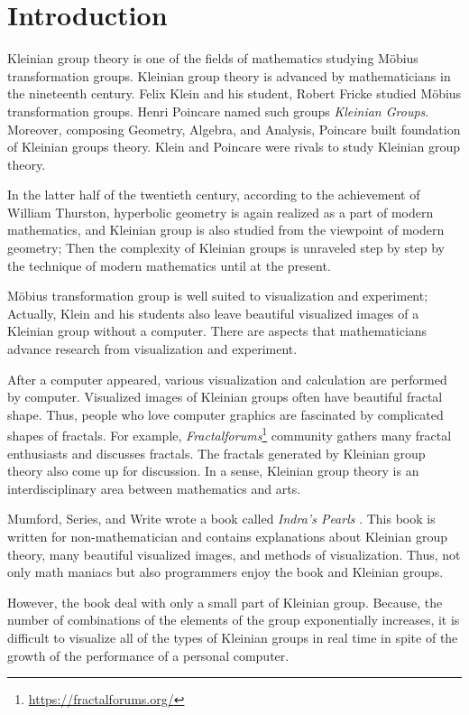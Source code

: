 
\section{Introduction}

Kleinian group theory is one of the fields of mathematics studying 
M\"obius transformation groups.
Kleinian group theory is advanced by mathematicians in the nineteenth
century.
Felix Klein and his student, Robert Fricke studied M\"obius
transformation groups.
Henri Poincare named such groups \textit{Kleinian Groups}.
Moreover, composing Geometry, Algebra, and Analysis,
Poincare built foundation of Kleinian groups theory.
Klein and Poincare were rivals to study Kleinian group theory.

In the latter half of the twentieth century, according to the achievement of William
Thurston, hyperbolic geometry is again realized as a part of modern
mathematics, and Kleinian group is also studied from the viewpoint of
modern geometry;
Then the complexity of Kleinian groups is unraveled step by step by
the technique of modern mathematics until at the present.

M\"obius transformation group is well suited to visualization and
experiment; Actually, Klein and his students also leave beautiful
visualized images of a Kleinian group without a computer.
There are aspects that mathematicians advance research from
visualization and experiment.

After a computer appeared, various visualization and calculation are
performed by computer.
Visualized images of Kleinian groups often have beautiful fractal shape.
Thus, people who love computer graphics are fascinated by complicated shapes of fractals.
For example,
\textit{Fractalforums}\footnote{\url{https://fractalforums.org/}}
community gathers many fractal enthusiasts and discusses fractals.
The fractals generated by Kleinian group theory also come up for
discussion.
In a sense, Kleinian group theory is an interdisciplinary area between
mathematics and arts.

Mumford, Series, and Write wrote a book called
\textit{Indra's Pearls} \cite{MumfordSeriesWright200204}.
This book is written for non-mathematician and contains explanations
about Kleinian group theory, many beautiful visualized images, and
methods of visualization.
Thus, not only math maniacs but also programmers enjoy the book and
Kleinian groups.

However, the book deal with only a small part of Kleinian group.
Because, the number of combinations of the elements of the group
exponentially increases, it is difficult to
visualize all of the types of Kleinian groups in real time
in spite of the growth of the performance of a personal computer.

